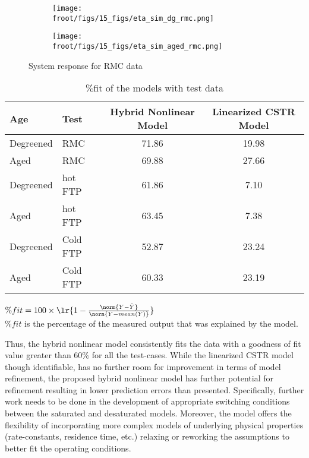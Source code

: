 \begin{figure}[H]
        \begin{minipage}{0.49\textwidth}
                \begin{figure}[H]
                        \centering
                        \texttt{[image: \\froot/figs/15\_figs/eta\_sim\_dg\_rmc.png]}
                \end{figure}
        \end{minipage}
        \begin{minipage}{0.49\textwidth}
                \begin{figure}[H]
                        \centering
                        \texttt{[image: \\froot/figs/15\_figs/eta\_sim\_aged\_rmc.png]}
                \end{figure}
        \end{minipage}
        \caption{System response for RMC data}
\end{figure}


\begin{table}[H]
        \centering
        \caption{$\%$fit of the models with test data}
        \label{tab::results}
        \begin{tabular}{l l c c}
                \hline \hline
                Age & Test & Hybrid Nonlinear Model & Linearized CSTR Model \\ \hline \hline
                Degreened & RMC & 71.86 & 19.98 \\
                Aged      & RMC & 69.88 & 27.66 \\ \hline
                Degreened & hot FTP & 61.86 & 7.10 \\
                Aged      & hot FTP & 63.45 & 7.38 \\ \hline
                Degreened & Cold FTP & 52.87 & 23.24 \\
                Aged      & Cold FTP & 60.33 & 23.19 \\ \hline
                \hline
        \end{tabular}

        $\%fit = 100 \times \lr{1 - \frac{\norm{Y- \hat Y}}{\norm{Y -
        mean(Y)}}}$ \\
        $\%fit$ is the percentage of the measured output that was explained by the
        model.
\end{table}

Thus, the hybrid nonlinear model consistently fits the data with a goodness of fit value greater than $60\%$ for all the
test-cases. While the linearized CSTR model though identifiable, has no further room for improvement in terms of model
refinement, the proposed hybrid nonlinear model has further potential for refinement resulting in lower prediction
errors than presented. Specifically, further work needs to be done in the development of appropriate switching
conditions between the saturated and desaturated models. Moreover, the model offers the flexibility of incorporating
more complex models of underlying physical properties (rate-constants, residence time, etc.) relaxing or reworking the
assumptions to better fit the operating conditions.
